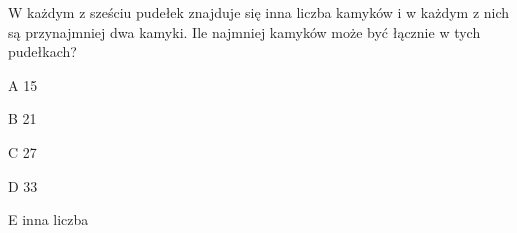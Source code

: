 \begin{tresc}
W każdym z sześciu pudełek znajduje się inna liczba kamyków i w każdym z nich są przynajmniej dwa kamyki. Ile najmniej kamyków może być łącznie w tych pudełkach?
\end{tresc}
\begin{wariant}{A} 15 \end{wariant}
\begin{wariant}{B} 21 \end{wariant}
\begin{wariant}{C} 27 \end{wariant}
\begin{wariant}{D} 33 \end{wariant}
\begin{wariant}{E} inna liczba \end{wariant}
